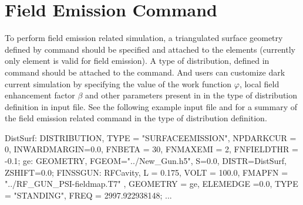 \section{Field Emission Command}
\label{sec:FieldEmissionCmd}
To perform field emission related simulation, a triangulated surface geometry defined by  command  should be specified and attached to the elements (currently only  element is valid for field emission). A  type of distribution, defined in  command should be attached to the  command. And users can customize dark current simulation by specifying the value of the work
function $\varphi$, local field enhancement factor $\beta$ and other parameters
present in  in the  type of distribution definition in input file. See the following example input file and  for a summary of the field emission related command in the  type of distribution definition.
\begin{example}
DistSurf: DISTRIBUTION, TYPE = "SURFACEEMISSION",
          NPDARKCUR = 0, INWARDMARGIN=0.0,
          FNBETA = 30, FNMAXEMI = 2,
          FNFIELDTHR = -0.1;
ge:       GEOMETRY, FGEOM="../New_Gun.h5",
          S=0.0, DISTR=DistSurf,
          ZSHIFT=0.0;
FINSSGUN: RFCavity, L = 0.175,
          VOLT = 100.0, FMAPFN = "../RF_GUN_PSI-fieldmap.T7" ,
          GEOMETRY = ge, ELEMEDGE =0.0,
          TYPE = "STANDING", FREQ = 2997.922938148;
...
\end{example}

